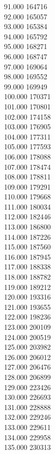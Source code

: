 { 91.000	164716 \\
 92.000	165057 \\
 93.000	165384 \\
 94.000	165792 \\
 95.000	168271 \\
 96.000	168747 \\
 97.000	169064 \\
 98.000	169552 \\
 99.000	169949 \\
 100.000	170371 \\
 101.000	170801 \\
 102.000	174158 \\
 103.000	176905 \\
 104.000	177311 \\
 105.000	177593 \\
 106.000	178088 \\
 107.000	178474 \\
 108.000	178811 \\
 109.000	179291 \\
 110.000	179668 \\
 111.000	180034 \\
 112.000	182446 \\
 113.000	186800 \\
 114.000	187226 \\
 115.000	187560 \\
 116.000	187945 \\
 117.000	188338 \\
 118.000	188782 \\
 119.000	189212 \\
 120.000	193316 \\
 121.000	193655 \\
 122.000	198236 \\
 123.000	200109 \\
 124.000	200519 \\
 125.000	203982 \\
 126.000	206012 \\
 127.000	206476 \\
 128.000	206899 \\
 129.000	223426 \\
 130.000	226693 \\
 131.000	228888 \\
 132.000	229246 \\
 133.000	229611 \\
 134.000	229958 \\
 135.000	230313 \\
}
